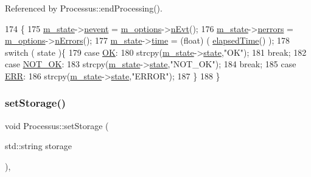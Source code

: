 Referenced by Processus\+::end\+Processing().


\begin{DoxyCode}
174                                      \{
175   \hyperlink{classProcessus_ab3539eee42891ceae0baf4395ae7fb61}{m\_state}->\hyperlink{structProcState_a1881d6b0db849a8af15f586ad5959260}{nevent}  = \hyperlink{classProcessus_a74205f3c1e00c4448f7b3257c2351797}{m\_options}->\hyperlink{classOptions_ad769b256263a4ac24dd6f989ae724ab7}{nEvt}();
176   \hyperlink{classProcessus_ab3539eee42891ceae0baf4395ae7fb61}{m\_state}->\hyperlink{structProcState_a51a0f54ba62b07e07ac8518c5f32828d}{nerrors} = \hyperlink{classProcessus_a74205f3c1e00c4448f7b3257c2351797}{m\_options}->\hyperlink{classOptions_acc6474323f0bbe17fa844e9a086b90b8}{nErrors}();
177   \hyperlink{classProcessus_ab3539eee42891ceae0baf4395ae7fb61}{m\_state}->\hyperlink{structProcState_a88c69b099d8f2b2164d478f28e87610f}{time}    = (float) ( \hyperlink{classProcessus_aecca96218c65bc805c988cd95447df55}{elapsedTime}() );
178   \textcolor{keywordflow}{switch} ( state )\{
179   \textcolor{keywordflow}{case} \hyperlink{classProcessus_a36278773bd98f2d5612fea40c7774821af77c64124fa175f28200166fff165ea2}{OK}:
180     strcpy(\hyperlink{classProcessus_ab3539eee42891ceae0baf4395ae7fb61}{m\_state}->\hyperlink{structProcState_aaffb70e5af437e2c0d4dfc69bd0b24cd}{state},\textcolor{stringliteral}{"OK"});
181     \textcolor{keywordflow}{break};
182   \textcolor{keywordflow}{case} \hyperlink{classProcessus_a36278773bd98f2d5612fea40c7774821a629082f49d6e8df6b6da2b8fbb9d80fb}{NOT\_OK}:
183     strcpy(\hyperlink{classProcessus_ab3539eee42891ceae0baf4395ae7fb61}{m\_state}->\hyperlink{structProcState_aaffb70e5af437e2c0d4dfc69bd0b24cd}{state},\textcolor{stringliteral}{"NOT\_OK"});
184     \textcolor{keywordflow}{break};
185   \textcolor{keywordflow}{case} \hyperlink{classProcessus_a36278773bd98f2d5612fea40c7774821adaf73ad5d0a09f952d0f18dbbe1c7493}{ERR}:
186     strcpy(\hyperlink{classProcessus_ab3539eee42891ceae0baf4395ae7fb61}{m\_state}->\hyperlink{structProcState_aaffb70e5af437e2c0d4dfc69bd0b24cd}{state},\textcolor{stringliteral}{"ERROR"});
187   \}
188 \}
\end{DoxyCode}
\mbox{\label{classProcessus_ad57a29b33f9021eda9f6929136f1784f}} 
\subsubsection{\texorpdfstring{set\+Storage()}{setStorage()}}
{\footnotesize\ttfamily void Processus\+::set\+Storage (\begin{DoxyParamCaption}\item[{std\+::string}]{storage }\end{DoxyParamCaption})\hspace{0.3cm}{\ttfamily [inline]}, {\ttfamily [inherited]}}

